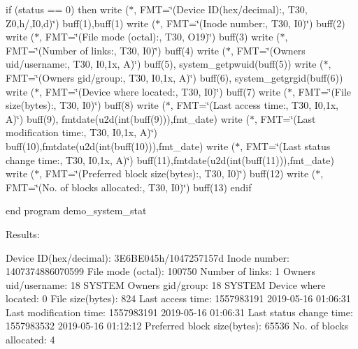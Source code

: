 if (status == 0) then write ($\ast$, F\+MT=\char`\"{}(\textquotesingle{}\+Device I\+D(hex/decimal)\+:\textquotesingle{},      T30, Z0,\textquotesingle{}h/\textquotesingle{},\+I0,\textquotesingle{}d\textquotesingle{})\char`\"{}) buff(1),buff(1) write ($\ast$, F\+MT=\char`\"{}(\textquotesingle{}\+Inode number\+:\textquotesingle{},                T30, I0)\char`\"{}) buff(2) write ($\ast$, F\+MT=\char`\"{}(\textquotesingle{}\+File mode (octal)\+:\textquotesingle{},           T30, O19)\char`\"{}) buff(3) write ($\ast$, F\+MT=\char`\"{}(\textquotesingle{}\+Number of links\+:\textquotesingle{},             T30, I0)\char`\"{}) buff(4) write ($\ast$, F\+MT=\char`\"{}(\textquotesingle{}\+Owner\textquotesingle{}\textquotesingle{}s uid/username\+:\textquotesingle{},       T30, I0,1x, A)\char`\"{}) buff(5), system\+\_\+getpwuid(buff(5)) write ($\ast$, F\+MT=\char`\"{}(\textquotesingle{}\+Owner\textquotesingle{}\textquotesingle{}s gid/group\+:\textquotesingle{},          T30, I0,1x, A)\char`\"{}) buff(6), system\+\_\+getgrgid(buff(6)) write ($\ast$, F\+MT=\char`\"{}(\textquotesingle{}\+Device where located\+:\textquotesingle{},        T30, I0)\char`\"{}) buff(7) write ($\ast$, F\+MT=\char`\"{}(\textquotesingle{}\+File size(bytes)\+:\textquotesingle{},            T30, I0)\char`\"{}) buff(8) write ($\ast$, F\+MT=\char`\"{}(\textquotesingle{}\+Last access time\+:\textquotesingle{},            T30, I0,1x, A)\char`\"{}) buff(9), fmtdate(u2d(int(buff(9))),fmt\+\_\+date) write ($\ast$, F\+MT=\char`\"{}(\textquotesingle{}\+Last modification time\+:\textquotesingle{},      T30, I0,1x, A)\char`\"{}) buff(10),fmtdate(u2d(int(buff(10))),fmt\+\_\+date) write ($\ast$, F\+MT=\char`\"{}(\textquotesingle{}\+Last status change time\+:\textquotesingle{},     T30, I0,1x, A)\char`\"{}) buff(11),fmtdate(u2d(int(buff(11))),fmt\+\_\+date) write ($\ast$, F\+MT=\char`\"{}(\textquotesingle{}\+Preferred block size(bytes)\+:\textquotesingle{}, T30, I0)\char`\"{}) buff(12) write ($\ast$, F\+MT=\char`\"{}(\textquotesingle{}\+No. of blocks allocated\+:\textquotesingle{},     T30, I0)\char`\"{}) buff(13) endif

end program demo\+\_\+system\+\_\+stat

Results\+:

Device ID(hex/decimal)\+: 3\+E6\+B\+E045h/1047257157d Inode number\+: 1407374886070599 File mode (octal)\+: 100750 Number of links\+: 1 Owner\textquotesingle{}s uid/username\+: 18 S\+Y\+S\+T\+EM Owner\textquotesingle{}s gid/group\+: 18 S\+Y\+S\+T\+EM Device where located\+: 0 File size(bytes)\+: 824 Last access time\+: 1557983191 2019-\/05-\/16 01\+:06\+:31 Last modification time\+: 1557983191 2019-\/05-\/16 01\+:06\+:31 Last status change time\+: 1557983532 2019-\/05-\/16 01\+:12\+:12 Preferred block size(bytes)\+: 65536 No. of blocks allocated\+: 4

